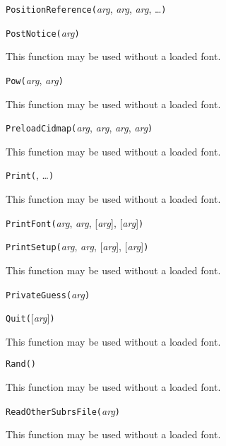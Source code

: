 
\noindent\texttt{PositionReference(}\textit{arg}, \textit{arg}, \textit{arg}, \ldots\texttt{)}


\noindent\texttt{PostNotice(}\textit{arg}\texttt{)}

This function may be used without a loaded font.


\noindent\texttt{Pow(}\textit{arg}, \textit{arg}\texttt{)}

This function may be used without a loaded font.


\noindent\texttt{PreloadCidmap(}\textit{arg}, \textit{arg}, \textit{arg}, \textit{arg}\texttt{)}

This function may be used without a loaded font.


\noindent\texttt{Print(}, \ldots\texttt{)}

This function may be used without a loaded font.


\noindent\texttt{PrintFont(}\textit{arg}, \textit{arg}, [\textit{arg}], [\textit{arg}]\texttt{)}


\noindent\texttt{PrintSetup(}\textit{arg}, \textit{arg}, [\textit{arg}], [\textit{arg}]\texttt{)}

This function may be used without a loaded font.


\noindent\texttt{PrivateGuess(}\textit{arg}\texttt{)}


\noindent\texttt{Quit(}[\textit{arg}]\texttt{)}

This function may be used without a loaded font.


\noindent\texttt{Rand(}\texttt{)}

This function may be used without a loaded font.


\noindent\texttt{ReadOtherSubrsFile(}\textit{arg}\texttt{)}

This function may be used without a loaded font.

